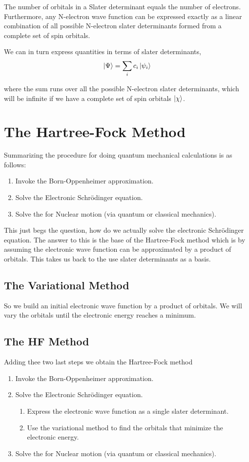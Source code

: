 \documentclass[a4paper]{article}
\begin{document}
The number of orbitals in a Slater determinant equals the number of electrons.
Furthermore, any N-electron wave function can be expressed exactly as a linear combination of all possible N-electron slater determinants formed from a complete set of spin orbitals.

We can in turn express quantities in terms of slater determinants,
$$ \ket{\Psi} = \sum_i c_i \ket{\psi_i} $$

where the sum runs over all the possible N-electron slater determinants, which will be infinite if we have a complete set of spin orbitals $\ket{\chi}$.



\section{The Hartree-Fock Method}
Summarizing the procedure for doing quantum mechanical calculations is as follows:
\begin{enumerate}
\item Invoke the Born-Oppenheimer approximation.
\item Solve the Electronic Schr\"odinger equation.
\item Solve the for Nuclear motion (via quantum or classical mechanics).
\end{enumerate}

This just begs the question, how do we actually solve the electronic Schr\"odinger equation.
The answer to this is the base of the Hartree-Fock method which is by assuming the electronic wave function can be approximated by a product of orbitals.
This takes us back to the use slater determinants as a basis.

\subsection{The Variational Method}
So we build an initial electronic wave function by a product of orbitals.
We will vary the orbitals until the electronic energy reaches a minimum.



\subsection{The HF Method}
Adding thee two last steps we obtain the Hartree-Fock method
\begin{enumerate}
\item Invoke the Born-Oppenheimer approximation.
\item Solve the Electronic Schr\"odinger equation.
	\begin{enumerate}
	\item Express the electronic wave function as a single slater determinant.
	\item Use the variational method to find the orbitals that minimize the electronic energy.
	\end{enumerate}
\item Solve the for Nuclear motion (via quantum or classical mechanics).
\end{enumerate}
\end{document}
